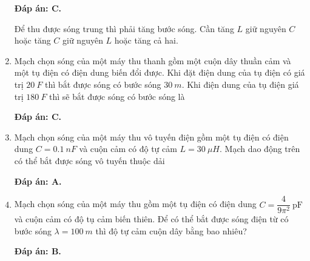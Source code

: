\begin{enumerate}[label=\bfseries Câu \arabic*:]
{\begin{mcq}
		\end{mcq}
	}
	
	\loigiai
	{		\textbf{Đáp án: C.}
		
		Để thu được sóng trung thì phải tăng bước sóng. Cần tăng $L$ giữ nguyên $C$ hoặc tăng $C$ giữ nguyên $L$ hoặc tăng cả hai.
	}
		\item {} 
	\cauhoi
	{Mạch chọn sóng của một máy thu thanh gồm một cuộn dây thuần cảm và một tụ điện có điện dung biến đổi được. Khi đặt điện dung của tụ điện có giá trị $\SI{20}{F}$ thì bắt được sóng có bước sóng $\SI{30}{m}$. Khi điện dung của tụ điện giá trị $\SI{180}{F}$ thì sẽ bắt được sóng có bước sóng là
		
	}
	
	\loigiai
	{		\textbf{Đáp án: C.}
		
		
	}
		\item {} 
	\cauhoi
	{Mạch chọn sóng của một máy thu vô tuyến điện gồm một tụ điện có điện dung $C = \SI{0,1}{nF}$ và cuộn cảm có độ tự cảm $L = \SI{30}{\mu H}$.  Mạch dao động trên có thể bắt được sóng vô tuyến thuộc dải
	}
	
	\loigiai
	{		\textbf{Đáp án: A.}
		
		
	}
		\item {} 
	\cauhoi
	{Mạch chọn sóng của một máy thu gồm một tụ điện có điện dung $C= \dfrac{4}{9\pi^2}\ \text{pF}$ và cuộn cảm có độ tụ cảm biến thiên. Để có thể bắt được sóng điện từ có bước sóng $\lambda = \SI{100}{m}$ thì độ tự cảm cuộn dây bằng bao nhiêu?
		
	}
	
	\loigiai
	{		\textbf{Đáp án: B.}
		
		
	}
\end{enumerate}

